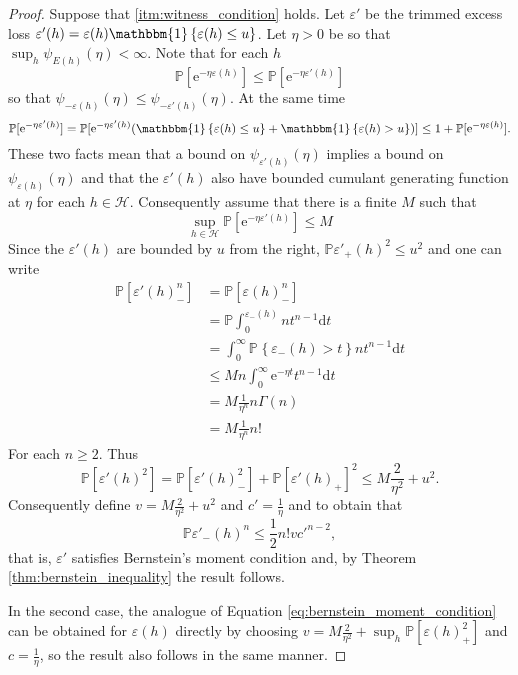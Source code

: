 \documentclass{uvamath}
\newcommand*{\calH}{\mathcal{H}}
\newcommand*{\bbP}{\mathbb{P}}
\newcommand*{\prob}[2][]{\mathbb{P}_{#1}\left\{#2\right\}}
\newcommand*{\indicator}[1]{\mathbbm{1}\left\{#1\right\}}
\newcommand*{\rme}{\mathrm{e}}
\newcommand*{\rmd}{\mathrm{d}}
\theoremstyle{remark}
\theoremstyle{definition}
\theoremstyle{definition}
\theoremstyle{definition}
\theoremstyle{definition}
\theoremstyle{definition}
\begin{document}
\begin{proof}
  Suppose that \ref{itm:witness_condition} holds. Let $\varepsilon'$
  be the trimmed excess loss
  $\varepsilon'(h) = \varepsilon(h)\indicator{\varepsilon(h)\leq
    u}$.
  Let $\eta>0$ be so that $\sup_{h}\psi_{E(h)}(\eta)<\infty$. Note
  that for each $h$
  \begin{equation*}
    \bbP[\rme^{-\eta \varepsilon(h)}]\leq \bbP[\rme^{-\eta \varepsilon'(h)}]
  \end{equation*}
  so that
  $\psi_{-\varepsilon(h)}(\eta)\leq
  \psi_{-\varepsilon'(h)}(\eta)$. At the same time
  \begin{equation*}
    \bbP[\rme^{-\eta \varepsilon'(h)}] = \bbP[\rme^{-\eta \varepsilon'(h)}(\indicator{\varepsilon(h)\leq u} + \indicator{\varepsilon(h) > u})] \leq 1 + \bbP[\rme^{-\eta \varepsilon(h)}].
  \end{equation*}
  These two facts mean that a bound on $\psi_{\varepsilon'(h)}(\eta)$
  implies a bound on $\psi_{\varepsilon(h)}(\eta)$ and that the
  $\varepsilon'(h)$ also have bounded cumulant generating function at
  $\eta$ for each $h\in\calH$. Consequently assume that there is a
  finite $M$ such that
  \begin{equation*}
    \sup_{h\in \calH}\bbP[\rme^{-\eta\varepsilon'(h)}]\leq M
  \end{equation*}
  Since the $\varepsilon'(h)$ are bounded by $u$ from the right,
  $\bbP \varepsilon'_{+}(h)^2 \leq u^2$ and one can write
  \begin{align*}
    \bbP[\varepsilon'(h)^n_{-}]
    &=  \bbP[\varepsilon(h)_{-}^n]\\
    &=
      \bbP\int_0^{\varepsilon_{-}(h)}n t^{n-1} \rmd t \\
    &=
    \int_0^\infty\prob{\varepsilon_-(h)>t} n t^{n-1}\rmd t\\
    &\leq
    M n\int_0^\infty \rme^{-\eta t} t^{n-1}\rmd t\\
    & = M\frac{1}{\eta^n}n\Gamma(n)\\
    & = M\frac{1}{\eta^n}n!
  \end{align*}
  For each $n\geq2$. Thus
  \begin{equation}\label{eq:second_moment_bound}
    \bbP [\varepsilon'(h)^2] = \bbP[ \varepsilon'(h)_-^2 ]+ \bbP[ \varepsilon'(h)_+]^2 \leq  M\frac{2}{\eta^2} + u^2.
  \end{equation}
  Consequently define $v = M\frac{2}{\eta^2} + u^2$ and
  $c' = \frac{1}{\eta}$ and to obtain that
  \begin{equation}\label{eq:bernstein_moment_condition}
    \bbP \varepsilon'_-(h)^n\leq \frac{1}{2}n!vc'^{n-2},
  \end{equation}
  that is, $\varepsilon'$ satisfies Bernstein's moment condition and,
  by Theorem \ref{thm:bernstein_inequality} the result follows.

  In the second case, the analogue of Equation
  \eqref{eq:bernstein_moment_condition} can be obtained for
  $\varepsilon(h)$ directly by choosing
  $v = M\frac{2}{\eta^2} + \sup_{h}\bbP[ \varepsilon(h)_+^2]$ and
  $c = \frac{1}{\eta}$, so the result also follows in the same manner.
\end{proof}
\end{document}
